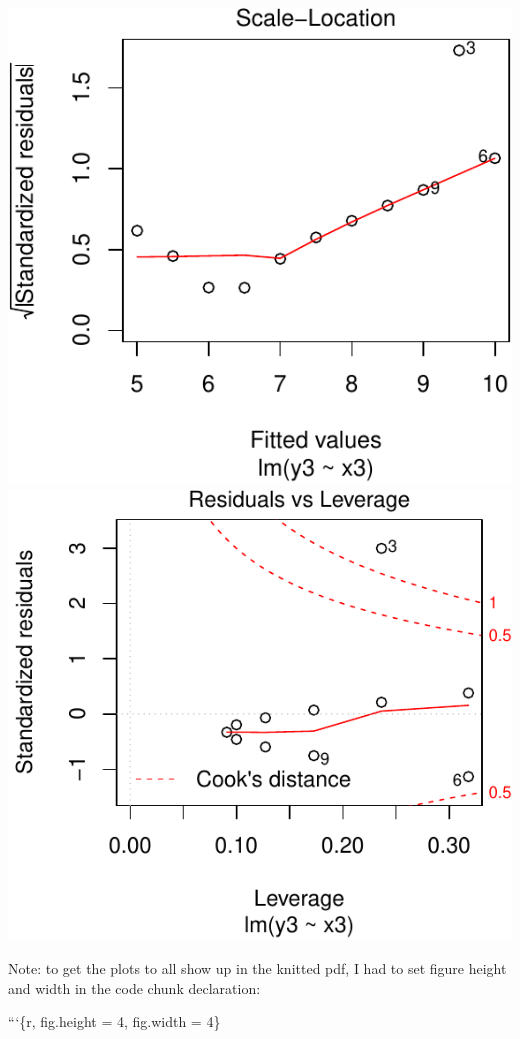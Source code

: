 \documentclass[]{extarticle}
\newenvironment{Shaded}{\begin{snugshade}}{\end{snugshade}}
\newcommand{\NormalTok}[1]{#1}
\begin{document}
\includegraphics{20190417_residual_diagnostics_files/figure-latex/unnamed-chunk-15-3.pdf}
\includegraphics{20190417_residual_diagnostics_files/figure-latex/unnamed-chunk-15-4.pdf}

Note: to get the plots to all show up in the knitted pdf, I had to set
figure height and width in the code chunk declaration:

\begin{Shaded}
\begin{Highlighting}[]
\NormalTok{```\{r, fig.height = 4, fig.width = 4\}}
\end{Highlighting}
\end{Shaded}
\end{document}
